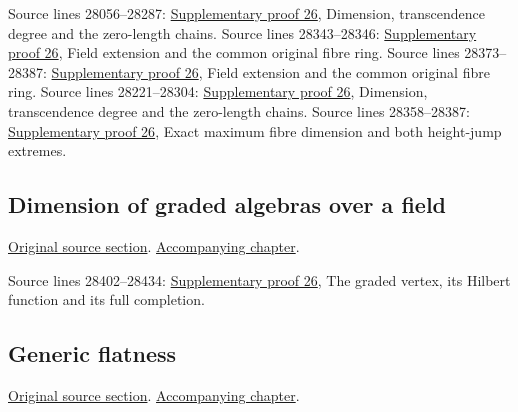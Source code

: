 \begin{AlgebraSourceRoutes}
 Source lines 28056--28287: \hyperlink{algebra_noether_dimension_notes_20260928}{Supplementary proof 26}, Dimension, transcendence degree and the zero-length chains.
 Source lines 28343--28346: \hyperlink{algebra_noether_dimension_notes_20260928}{Supplementary proof 26}, Field extension and the common original fibre ring.
 Source lines 28373--28387: \hyperlink{algebra_noether_dimension_notes_20260928}{Supplementary proof 26}, Field extension and the common original fibre ring.
 Source lines 28221--28304: \hyperlink{algebra_noether_dimension_notes_20260928}{Supplementary proof 26}, Dimension, transcendence degree and the zero-length chains.
 Source lines 28358--28387: \hyperlink{algebra_noether_dimension_notes_20260928}{Supplementary proof 26}, Exact maximum fibre dimension and both height-jump extremes.
\end{AlgebraSourceRoutes}

\subsection{Dimension of graded algebras over a field}
\hypertarget{algebra-source-section-dimension-graded}{}
\noindent\href{https://github.com/stacks/stacks-project/blob/a04446e57ec1fbc252a871afcec7752fb2807b14/algebra.tex\#L28395}{Original source section}. \href{algebra.pdf\#nameddest=section-dimension-graded}{Accompanying chapter}.

\begin{AlgebraSourceRoutes}
 Source lines 28402--28434: \hyperlink{algebra_noether_dimension_notes_20260928}{Supplementary proof 26}, The graded vertex, its Hilbert function and its full completion.
\end{AlgebraSourceRoutes}

\subsection{Generic flatness}
\hypertarget{algebra-source-section-generic-flatness}{}
\noindent\href{https://github.com/stacks/stacks-project/blob/a04446e57ec1fbc252a871afcec7752fb2807b14/algebra.tex\#L28448}{Original source section}. \href{algebra.pdf\#nameddest=section-generic-flatness}{Accompanying chapter}.

